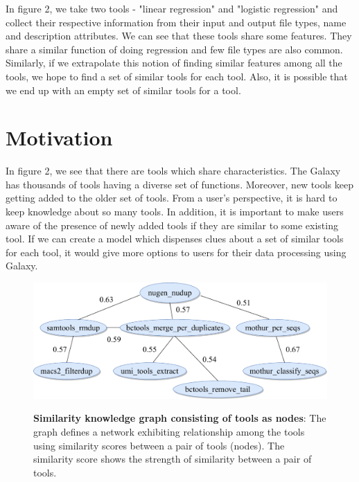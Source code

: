 In figure 2, we take two tools - "linear regression" and "logistic regression" and collect their respective information from their input and output file types, name and description attributes. We can see that these tools share some features. They share a similar function of doing regression and few file types are also common. Similarly, if we extrapolate this notion of finding similar features among all the tools, we hope to find a set of similar tools for each tool. Also, it is possible that we end up with an empty set of similar tools for a tool.

\section{Motivation}
In figure 2, we see that there are tools which share characteristics. The Galaxy has thousands of tools having a diverse set of functions. Moreover, new tools keep getting added to the older set of tools. From a user's perspective, it is hard to keep knowledge about so many tools. In addition, it is important to make users aware of the presence of newly added tools if they are similar to some existing tool. If we can create a model which dispenses clues about a set of similar tools for each tool, it would give more options to users for their data processing using Galaxy. 

\begin{figure}[h]
\begin{centering}
    {\includegraphics[scale=0.6]{figures/tools_sim_know_graph.pdf}}
    \caption[Similarity knowledge graph consisting of tools as nodes]{\textbf{Similarity knowledge graph consisting of tools as nodes}: The graph defines a network exhibiting relationship among the tools using similarity scores between a pair of tools (nodes). The similarity score shows the strength of similarity between a pair of tools.}
\end{centering}
\end{figure}

